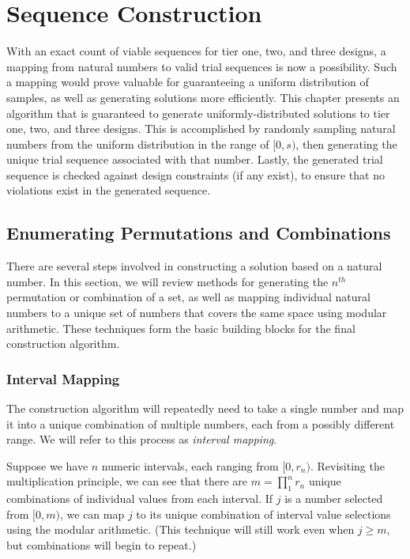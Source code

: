
\chapter{Sequence Construction}

With an exact count of viable sequences for tier one, two, and three designs, a mapping from natural numbers to valid trial sequences is now a possibility. Such a mapping would prove valuable for guaranteeing a uniform distribution of samples, as well as generating solutions more efficiently. This chapter presents an algorithm that is guaranteed to generate uniformly-distributed solutions to tier one, two, and three designs. This is accomplished by randomly sampling natural numbers from the uniform distribution in the range of $[0, s)$, then generating the unique trial sequence associated with that number. Lastly, the generated trial sequence is checked against design constraints (if any exist), to ensure that no violations exist in the generated sequence.


\section{Enumerating Permutations and Combinations}

There are several steps involved in constructing a solution based on a natural number. In this section, we will review methods for generating the $n^{th}$ permutation or combination of a set, as well as mapping individual natural numbers to a unique set of numbers that covers the same space using modular arithmetic. These techniques form the basic building blocks for the final construction algorithm.

\subsection{Interval Mapping}

The construction algorithm will repeatedly need to take a single number and map it into a unique combination of multiple numbers, each from a possibly different range. We will refer to this process as \textit{interval mapping}.

Suppose we have $n$ numeric intervals, each ranging from $[0, r_n)$. Revisiting the multiplication principle, we can see that there are $m = \prod_1^n r_n$ unique combinations of individual values from each interval. If $j$ is a number selected from $[0, m)$, we can map $j$ to its unique combination of interval value selections using the modular arithmetic. (This technique will still work even when $j \geq m$, but combinations will begin to repeat.)

